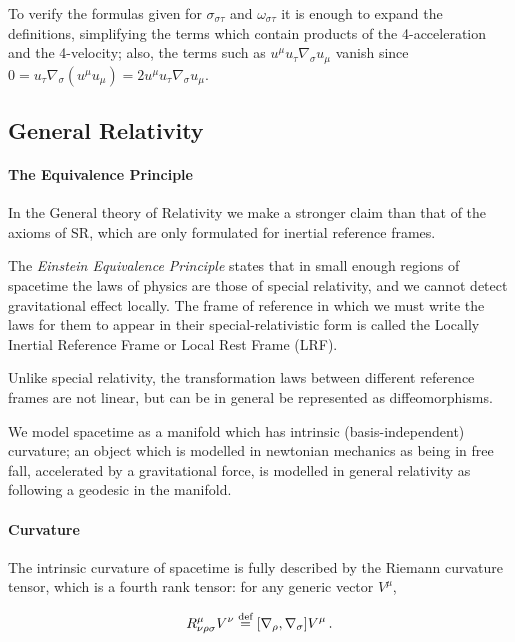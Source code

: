 \documentclass[main.tex]{subfiles}
\begin{document}
To verify the formulas given for \(\sigma_{\sigma \tau}\) and \(\omega_{\sigma \tau}\) it is enough to expand the definitions, simplifying the terms which contain products of the 4-acceleration and the 4-velocity; also, the terms such as \(u^\mu u_{\tau}\nabla_{\sigma} u_\mu \) vanish since \( 0= u_{\tau} \nabla_{\sigma} (u^\mu u_\mu) = 2 u^\mu u_{\tau}\nabla_{\sigma} u_\mu\).

\subsection{General Relativity}

\paragraph{The Equivalence Principle}

In the General theory of Relativity we make a stronger claim than that of the axioms of SR, which are only formulated for inertial reference frames.

The \emph{Einstein Equivalence Principle} states \cite[100]{Carroll:1997ar} that in small enough regions of spacetime the laws of physics are those of special relativity, and we cannot detect gravitational effect locally.
The frame of reference in which we must write the laws for them to appear in their special-relativistic form is called the Locally Inertial Reference Frame or Local Rest Frame (LRF).

Unlike special relativity, the transformation laws between different reference frames are not linear, but can be in general be represented as diffeomorphisms.

We model spacetime as a manifold which has intrinsic (basis-independent) curvature; an object which is modelled in newtonian mechanics as being in free fall, accelerated by a gravitational force, is modelled in general relativity as following a geodesic in the manifold.

\paragraph{Curvature}

The intrinsic curvature of spacetime is fully described by the Riemann curvature tensor, which is a fourth rank tensor: for any generic vector \(V^\mu\),

\begin{equation} \label{eq:riemann-tensor-def}
    R ^{\mu} _{\nu \rho \sigma} V^\nu \stackrel{\text{def}}{=} [\nabla_\rho, \nabla_\sigma]   V^\mu \,.
\end{equation}
\end{document}

